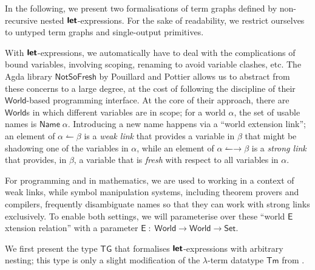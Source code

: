 \documentclass[copyright]{eptcs}
\newcommand{\Conid}[1]{\mathit{#1}}
\newcommand{\Varid}[1]{\mathit{#1}}
\renewcommand\Varid[1]{\mathord{\textsf{#1}}}
\let\Conid\Varid
\newcommand\Keyword[1]{\textsf{\textbf{#1}}}
\newcounter{x}
\newcounter{y}
\begin{document}
In the following,
we present two formalisations of term graphs
defined by non-recursive nested \ensuremath{\Keyword{let}}-expressions.
For the sake of readability,
we restrict ourselves to untyped term graphs
and single-output primitives.

With \ensuremath{\Keyword{let}}-expressions,
we automatically have to deal with the complications
of bound variables,
involving scoping, renaming to avoid variable clashes, etc.
The Agda library \ensuremath{\Conid{NotSoFresh}} by Pouillard and Pottier
\cite{Pouillard-Pottier-2010} allows us to abstract
from these concerns to a large degree,
at the cost of following the discipline of their
\ensuremath{\Conid{World}}-based programming interface.
At the core of their approach,
there are \ensuremath{\Conid{World}}s in which different variables are in scope;
for a world \ensuremath{\Varid{α}}, the set of usable names is \ensuremath{\Conid{Name}\;\Varid{α}}.
Introducing a new name happens via a ``world extension link'';
an element of \ensuremath{\Varid{α}\;\Varid{↼}\;\Varid{β}} is a \emph{weak link} that provides a variable
in \ensuremath{\Varid{β}} that might be shadowing one of the variables in \ensuremath{\Varid{α}},
while an element of \ensuremath{\Varid{α}\;\Varid{↼→}\;\Varid{β}} is a \emph{strong link} that provides,
in \ensuremath{\Varid{β}}, a variable that is \emph{fresh} with respect to all variables in \ensuremath{\Varid{α}}.

For programming and in mathematics,
we are used to working in a context of weak links,
while symbol manipulation systems,
including theorem provers and compilers,
frequently disambiguate names so that they can work with strong links exclusively.
To enable both settings, we will parameterise over these
``world \ensuremath{\Conid{E}}xtension relation'' with a parameter \ensuremath{\Conid{E}\;\mathbin{:}\;\Conid{World}\;\Varid{→}\;\Conid{World}\;\Varid{→}\;\Conid{Set}}.


We first present the type \ensuremath{\Conid{TG}}
that formalises \ensuremath{\Keyword{let}}-expressions with arbitrary nesting;
this type is only a slight modification of the $\lambda$-term datatype
\ensuremath{\Conid{Tm}} from \cite{Pouillard-Pottier-2010}.
\end{document}
